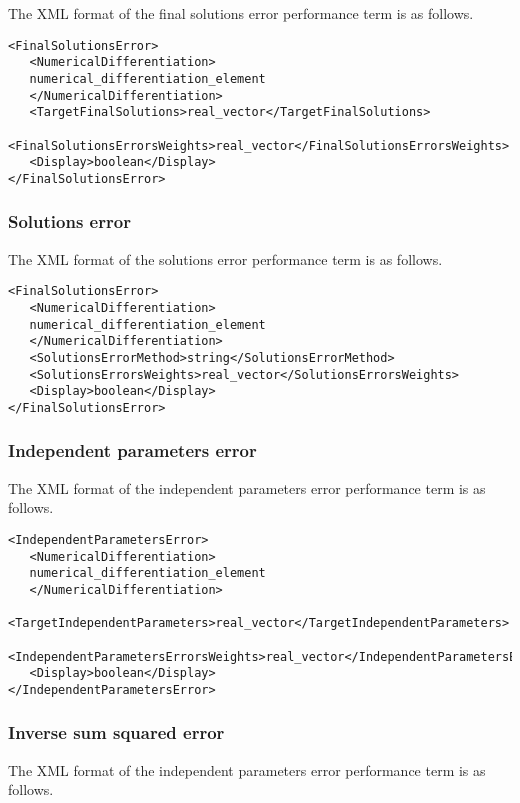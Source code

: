 The XML format of the final solutions error performance term is as follows.

\begin{lstlisting}
<FinalSolutionsError>
   <NumericalDifferentiation>
   numerical_differentiation_element
   </NumericalDifferentiation>
   <TargetFinalSolutions>real_vector</TargetFinalSolutions>
   <FinalSolutionsErrorsWeights>real_vector</FinalSolutionsErrorsWeights>
   <Display>boolean</Display>
</FinalSolutionsError>
\end{lstlisting}

\subsubsection*{Solutions error}

The XML format of the solutions error performance term is as follows.

\begin{lstlisting}
<FinalSolutionsError>
   <NumericalDifferentiation>
   numerical_differentiation_element
   </NumericalDifferentiation>
   <SolutionsErrorMethod>string</SolutionsErrorMethod>
   <SolutionsErrorsWeights>real_vector</SolutionsErrorsWeights>
   <Display>boolean</Display>
</FinalSolutionsError>
\end{lstlisting}

\subsubsection*{Independent parameters error}

The XML format of the independent parameters error performance term is as follows.

\begin{lstlisting}
<IndependentParametersError>
   <NumericalDifferentiation>
   numerical_differentiation_element
   </NumericalDifferentiation>
   <TargetIndependentParameters>real_vector</TargetIndependentParameters>
   <IndependentParametersErrorsWeights>real_vector</IndependentParametersErrorsWeights>
   <Display>boolean</Display>
</IndependentParametersError>
\end{lstlisting}

\subsubsection*{Inverse sum squared error}

The XML format of the independent parameters error performance term is as follows.

